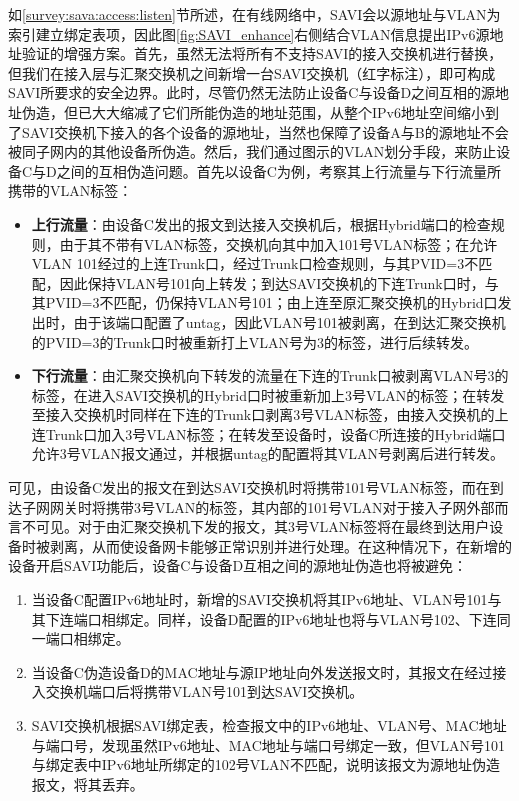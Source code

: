     如\ref{survey:sava:access:listen}节所述，在有线网络中，SAVI会以源地址与VLAN为索引建立绑定表项，因此图\ref{fig:SAVI_enhance}右侧结合VLAN信息提出IPv6源地址验证的增强方案。首先，虽然无法将所有不支持SAVI的接入交换机进行替换，但我们在接入层与汇聚交换机之间新增一台SAVI交换机（红字标注），即可构成SAVI所要求的安全边界。此时，尽管仍然无法防止设备C与设备D之间互相的源地址伪造，但已大大缩减了它们所能伪造的地址范围，从整个IPv6地址空间缩小到了SAVI交换机下接入的各个设备的源地址，当然也保障了设备A与B的源地址不会被同子网内的其他设备所伪造。然后，我们通过图示的VLAN划分手段，来防止设备C与D之间的互相伪造问题。首先以设备C为例，考察其上行流量与下行流量所携带的VLAN标签：
    \begin{itemize}
      \item \textbf{上行流量}：由设备C发出的报文到达接入交换机后，根据Hybrid端口的检查规则，由于其不带有VLAN标签，交换机向其中加入101号VLAN标签；在允许VLAN 101经过的上连Trunk口，经过Trunk口检查规则，与其PVID=3不匹配，因此保持VLAN号101向上转发；到达SAVI交换机的下连Trunk口时，与其PVID=3不匹配，仍保持VLAN号101；由上连至原汇聚交换机的Hybrid口发出时，由于该端口配置了untag，因此VLAN号101被剥离，在到达汇聚交换机的PVID=3的Trunk口时被重新打上VLAN号为3的标签，进行后续转发。
      \item \textbf{下行流量}：由汇聚交换机向下转发的流量在下连的Trunk口被剥离VLAN号3的标签，在进入SAVI交换机的Hybrid口时被重新加上3号VLAN的标签；在转发至接入交换机时同样在下连的Trunk口剥离3号VLAN标签，由接入交换机的上连Trunk口加入3号VLAN标签；在转发至设备时，设备C所连接的Hybrid端口允许3号VLAN报文通过，并根据untag的配置将其VLAN号剥离后进行转发。
    \end{itemize}

    可见，由设备C发出的报文在到达SAVI交换机时将携带101号VLAN标签，而在到达子网网关时将携带3号VLAN的标签，其内部的101号VLAN对于接入子网外部而言不可见。对于由汇聚交换机下发的报文，其3号VLAN标签将在最终到达用户设备时被剥离，从而使设备网卡能够正常识别并进行处理。在这种情况下，在新增的设备开启SAVI功能后，设备C与设备D互相之间的源地址伪造也将被避免：
    \begin{enumerate}[1{)}]
      \item 当设备C配置IPv6地址时，新增的SAVI交换机将其IPv6地址、VLAN号101与其下连端口相绑定。同样，设备D配置的IPv6地址也将与VLAN号102、下连同一端口相绑定。
      \item 当设备C伪造设备D的MAC地址与源IP地址向外发送报文时，其报文在经过接入交换机端口后将携带VLAN号101到达SAVI交换机。
      \item SAVI交换机根据SAVI绑定表，检查报文中的IPv6地址、VLAN号、MAC地址与端口号，发现虽然IPv6地址、MAC地址与端口号绑定一致，但VLAN号101与绑定表中IPv6地址所绑定的102号VLAN不匹配，说明该报文为源地址伪造报文，将其丢弃。
    \end{enumerate}
    
